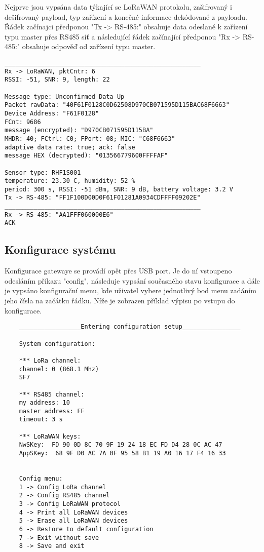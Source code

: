 Nejprve jsou vypsána data týkající se LoRaWAN protokolu, zašifrovaný i dešifrovaný payload, typ zařízení a konečné informace dekódované z payloadu.
Řádek začínajci předponou "Tx -> RS-485:" obsahuje data odeslané k zařízení typu master přes RS485 síť a následující řádek začínající předponou "Rx -> RS-485:" obsahuje odpověď od zařízení typu master.

\begin{lstlisting}
______________________________________________________
Rx -> LoRaWAN, pktCntr: 6
RSSI: -51, SNR: 9, length: 22

Message type: Unconfirmed Data Up
Packet rawData: "40F61F0128C0D62508D970CB071595D115BAC68F6663"
Device Address: "F61F0128"
FCnt: 9686
message (encrypted): "D970CB071595D115BA"
MHDR: 40; FCtrl: C0; FPort: 08; MIC: "C68F6663"
adaptive data rate: true; ack: false
message HEX (decrypted): "013566779600FFFFAF"

Sensor type: RHF1S001
temperature: 23.30 C, humidity: 52 %
period: 300 s, RSSI: -51 dBm, SNR: 9 dB, battery voltage: 3.2 V
Tx -> RS-485: "FF1F100D00D0F61F01281A0934CDFFFF09202E"
______________________________________________________
Rx -> RS-485: "AA1FFF060000E6"
ACK
\end{lstlisting}

\subsection{Konfigurace systému}
\label{sec:konfigurace}
Konfigurace gatewaye se provádí opět přes USB port. Je do ní vstoupeno odesláním příkazu
"config", následuje vypsání současného stavu konfigurace a dále je vypsáno konfigurační menu, kde uživatel vybere jednotlivý bod menu zadáním jeho čísla na začátku řádku.
Níže je zobrazen příklad výpisu po vstupu do konfigurace.

\begin{lstlisting}
    _________________Entering configuration setup________________
    
    System configuration:
    
    *** LoRa channel: 
    channel: 0 (868.1 Mhz)
    SF7
    
    *** RS485 channel: 
    my address: 10
    master address: FF
    timeout: 3 s
    
    *** LoRaWAN keys: 
    NwSKey:  FD 90 0D 8C 70 9F 19 24 18 EC FD D4 28 0C AC 47
    AppSKey:  68 9F D0 AC 7A 0F 95 58 B1 19 A0 16 17 F4 16 33
    
    
    Config menu:
    1 -> Config LoRa channel
    2 -> Config RS485 channel
    3 -> Config LoRaWAN protocol
    4 -> Print all LoRaWAN devices
    5 -> Erase all LoRaWAN devices
    6 -> Restore to default configuration
    7 -> Exit without save
    8 -> Save and exit
\end{lstlisting}


